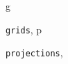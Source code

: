 \documentclass[a4paper,12ptopenany,oneside]{sphinxmanual}
\begin{document}
\renewcommand{\indexname}{Python Module Index}
\begin{theindex}
\def\bigletter#1{{\Large\sffamily#1}\nopagebreak\vspace{1mm}}
\bigletter{g}
\item {\texttt{grids}}, \pageref{grids:module-grids}
\indexspace
\bigletter{p}
\item {\texttt{projections}}, \pageref{projections:module-projections}
\end{theindex}

\renewcommand{\indexname}{Index}
\printindex
\end{document}
